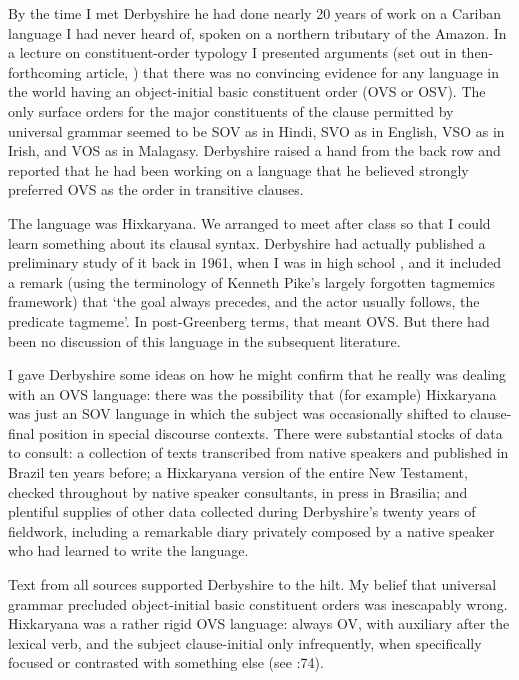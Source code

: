 \documentclass[output=paper,colorlinks,citecolor=brown
]{langscibook}
\begin{document}
By the time I met Derbyshire he had done nearly 20 years of work on
a Cariban language I had never heard of, spoken on a northern tributary
of the Amazon. In a lecture on constituent-order typology I presented
arguments (set out in then-forthcoming article, \citet{Pullum77})
that there was no convincing evidence for any language in the world
having an object-initial basic constituent order (OVS or OSV). The
only surface orders for the major constituents of the clause permitted
by universal grammar seemed to be SOV as in Hindi, SVO as in English,
VSO as in Irish, and VOS as in Malagasy. Derbyshire raised a hand
from the back row and reported that he had been working on a language
that he believed strongly preferred OVS as the order in transitive
clauses.

The language was Hixkaryana. We arranged to meet after class so that
I could learn something about its clausal syntax. Derbyshire had actually
published a preliminary study of it back in 1961, when I was in high
school \citep{Derbyshire61}, and it included a remark (using the
terminology of Kenneth Pike's largely forgotten tagmemics framework)
that `the goal always precedes, and the actor usually follows, the
predicate tagmeme'. In post-Greenberg terms, that meant OVS. But
there had been no discussion of this language in the subsequent
literature.

I gave Derbyshire some ideas on how he might confirm that he really
was dealing with an OVS language: there was the possibility that
(for example) Hixkaryana was just an SOV language in which the subject
was occasionally shifted to clause-final position in special discourse
contexts. There were substantial stocks of data to consult: a
collection of texts transcribed from native speakers and published
in Brazil ten years before; a Hixkaryana version of the entire New
Testament, checked throughout by native speaker consultants, in press
in Brasilia; and plentiful supplies of other data collected during
Derbyshire's twenty years of fieldwork, including a remarkable diary
privately composed by a native speaker who had learned to write the
language.

Text from all sources supported Derbyshire to the hilt. My belief
that universal grammar precluded object-initial basic constituent
orders was inescapably wrong. Hixkaryana was a rather rigid OVS
language: always OV, with auxiliary after the lexical verb, and
the subject clause-initial only infrequently, when specifically
focused or contrasted with something else (see
\citealt{Derbyshire85}:74).
\end{document}
